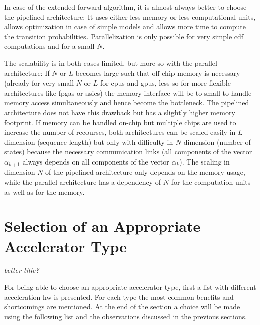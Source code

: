 \documentclass[mscthesis]{usiinfthesis}
\begin{document}
In case of the extended forward algorithm, it is almost always better to choose
the pipelined architecture: It uses either less memory or less computational
units, allows optimization in case of simple models and allows more time to
compute the transition probabilities. Parallelization is only possible for very
simple \gls{cdf} computations and for a small $N$.

The scalability is in both cases limited, but more so with the parallel
architecture: If $N$ or $L$ becomes large such that off-chip memory is
necessary (already for very small $N$ or $L$ for \glspl{cpu} and \glspl{gpu},
less so for more flexible architectures like \glspl{fpga} or \glspl{asic}) the
memory interface will be to small to handle memory access simultaneously and
hence become the bottleneck. The pipelined architecture does not have this
drawback but has a slightly higher memory footprint. If memory can be handled
on-chip but multiple chips are used to increase the number of recourses, both
architectures can be scaled easily in $L$ dimension (sequence length) but only
with difficulty in $N$ dimension (number of states) because the necessary
communication links (all components of the vector $\alpha_{k+1}$ always depends
on all components of the vector $\alpha_k$). The scaling in dimension $N$ of
the pipelined architecture only depends on the memory usage, while the parallel
architecture has a dependency of $N$ for the computation units as well as for
the memory.

\section{Selection of an Appropriate Accelerator Type}
\label{ch:analysis_choice}

\emph{\color{red}better title?}

For being able to choose an appropriate accelerator type, first a list with
different acceleration \gls{hw} is presented. For each type the most common
benefits and shortcomings are mentioned. At the end of the section a choice
will be made using the following list and the observations discussed in the
previous sections.
\end{document}
